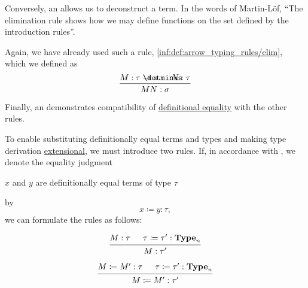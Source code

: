 \begin{remark}
\begin{thmenum}
     Conversely, an  allows us to deconstruct a term. In the words of Martin-L\"of, \enquote{The elimination rule shows how we may define functions on the set defined by the introduction rules}.

    Again, we have already used such a rule, \ref{inf:def:arrow_typing_rules/elim}, which we defined as
    \begin{equation*}
      \begin{prooftree}
        \hypo{ M: \tau \synimplies \sigma }
        \hypo{ N: \tau }
        \infer2{ M N: \sigma }
      \end{prooftree}
    \end{equation*}

     Finally, an  demonstrates compatibility of \hyperref[con:equality]{definitional equality} with the other rules.

    To enable substituting definitionally equal terms and types and making type derivation \hyperref[con:extensionality]{extensional}, we must introduce two rules. If, in accordance with , we denote the equality judgment
    \begin{center}
      \( x \) and \( y \) are definitionally equal terms of type \( \tau \)
    \end{center}
    by
    \begin{equation*}
      x \coloneqq y: \tau,
    \end{equation*}
    we can formulate the rules as follows:
    \begin{paracol}{2}
      \begin{leftcolumn}
        \ParacolAlignmentHack
        \begin{equation*}
          \begin{prooftree}
            \hypo{ M: \tau }
            \hypo{ \tau \coloneqq \tau': \op*{Type}_n }
            \infer2{ M: \tau' }
          \end{prooftree}
        \end{equation*}
      \end{leftcolumn}

      \begin{rightcolumn}
        \ParacolAlignmentHack
        \begin{equation*}
          \begin{prooftree}
            \hypo{ M \coloneqq M': \tau }
            \hypo{ \tau \coloneqq \tau': \op*{Type}_n }
            \infer2{ M \coloneqq M': \tau' }
          \end{prooftree}
        \end{equation*}
      \end{rightcolumn}
    \end{paracol}


\end{thmenum}
\end{remark}

